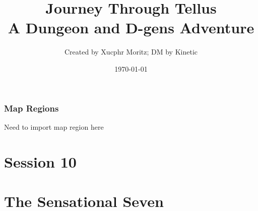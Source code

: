 \documentclass[letterpaper,twocolumn,openany,nodeprecatedcode]{dndbook}
\title{Journey Through Tellus \\
\large A Dungeon and D-gens Adventure}
\author{Created by Xucphr Moritz; DM by Kinetic}
\date{\today}
\begin{document}
\frontmatter

\maketitle

\tableofcontents

\mainmatter%



\section{Map Regions}

Need to import map region here





%
%
%
\part{Session 10}


%

\part{The Sensational Seven}



%


%
\end{document}

